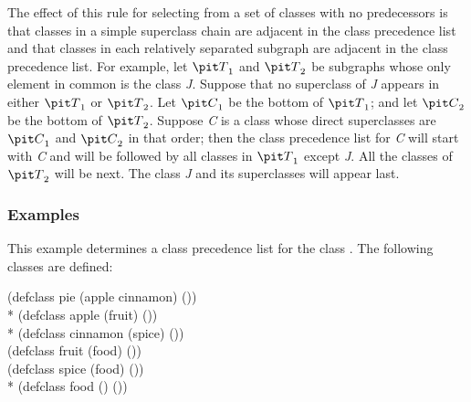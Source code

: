 The effect of this rule for selecting from a set of classes with no
predecessors is that classes in a simple superclass chain are
adjacent in the class precedence list and that classes in each
relatively separated subgraph are adjacent in the class
precedence list. For example, let ${\it T}\sub 1$ and ${\it T}\sub 2$ be subgraphs
whose only element in common is the class {\it J}. Suppose
that no superclass of {\it J} appears in either ${\it T}\sub 1$ or ${\it T}\sub 2$.
Let ${\it C}\sub 1$ be the bottom of ${\it T}\sub 1$; and let ${\it C}\sub 2$ be the
bottom of ${\it T}\sub 2$.  Suppose {\it C} is a class whose direct superclasses
are ${\it C}\sub 1$ and ${\it C}\sub 2$ in that order; then the class precedence
list for {\it C} will start with {\it C} and will be followed by all classes
in ${\it T}\sub 1$ except {\it J}. All the classes of ${\it T}\sub 2$ will be next.
The class {\it J} and its superclasses will appear last.


\subsubsection{Examples}

This example determines a class precedence list for the
class .  The following classes are defined:

\begin{lisp}
(defclass pie (apple cinnamon) ()) \\*
(defclass apple (fruit) ()) \\*
(defclass cinnamon (spice) ()) \\
(defclass fruit (food) ()) \\
(defclass spice (food) ()) \\*
(defclass food () ())
\end{lisp}

